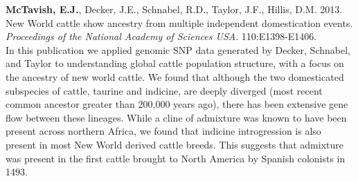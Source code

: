 \documentclass[10pt]{article}
\begin{document}
\textbf{McTavish, E.J.}, Decker, J.E., Schnabel, R.D., Taylor, J.F., Hillis, D.M. 2013. New World cattle show ancestry from multiple independent domestication events.  \textsl{Proceedings of the National Academy of Sciences USA}. 110:E1398-E1406.\\

In this publication we applied genomic SNP data generated by Decker, Schnabel, and Taylor to understanding global cattle population structure, with a focus on the ancestry of new world cattle. 
We found that although the two domesticated subspecies of cattle, taurine and indicine, are deeply diverged (most recent common ancestor greater than 200,000 years ago), there has been extensive gene flow between these lineages. 
While a cline of admixture was known to have been present across northern Africa, we found that indicine introgression is also present in most New World derived cattle breeds. This suggests that admixture was present in the first cattle brought to North America by Spanish colonists in 1493.
\end{document}
